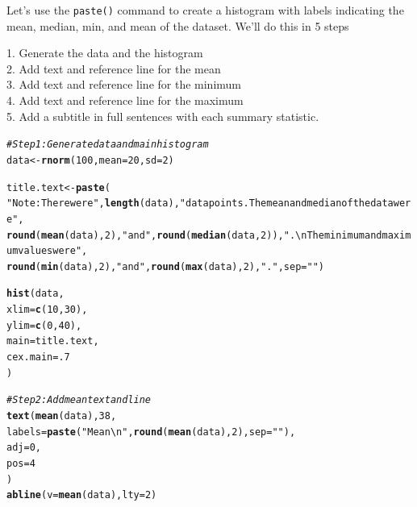 \documentclass{tufte-book}\usepackage[]{graphicx}\usepackage[]{color}
\makeatletter
\newcommand{\hlnum}[1]{\textcolor[rgb]{0.686,0.059,0.569}{#1}}%
\newcommand{\hlstr}[1]{\textcolor[rgb]{0.192,0.494,0.8}{#1}}%
\newcommand{\hlcom}[1]{\textcolor[rgb]{0.678,0.584,0.686}{\textit{#1}}}%
\newcommand{\hlstd}[1]{\textcolor[rgb]{0.345,0.345,0.345}{#1}}%
\newcommand{\hlkwb}[1]{\textcolor[rgb]{0.69,0.353,0.396}{#1}}%
\newcommand{\hlkwc}[1]{\textcolor[rgb]{0.333,0.667,0.333}{#1}}%
\newcommand{\hlkwd}[1]{\textcolor[rgb]{0.737,0.353,0.396}{\textbf{#1}}}%
\newenvironment{kframe}{%
 \def\at@end@of@kframe{}%
 \ifinner\ifhmode%
  \def\at@end@of@kframe{\end{minipage}}%
  \begin{minipage}{\columnwidth}%
 \fi\fi%
 \def\FrameCommand##1{\hskip\@totalleftmargin \hskip-\fboxsep
 \colorbox{shadecolor}{##1}\hskip-\fboxsep
     \hskip-\linewidth \hskip-\@totalleftmargin \hskip\columnwidth}%
 \MakeFramed {\advance\hsize-\width
   \@totalleftmargin\z@ \linewidth\hsize
   \@setminipage}}%
 {\par\unskip\endMakeFramed%
 \at@end@of@kframe}
\newenvironment{knitrout}{}{} %
\makeatother
\begin{document}
Let's use the \texttt{paste()} command to create a histogram with labels indicating the mean, median, min, and mean of the dataset. We'll do this in 5 steps

1. Generate the data and the histogram\\
2. Add text and reference line for the mean\\
3. Add text and reference line for the minimum\\
4. Add text and reference line for the maximum\\
5. Add a subtitle in full sentences with each summary statistic.

\begin{footnotesize}
\begin{knitrout}
\color{fgcolor}\begin{kframe}
\begin{alltt}
\hlcom{# Step 1: Generate data and main histogram}
\hlstd{data} \hlkwb{<-} \hlkwd{rnorm}\hlstd{(}\hlnum{100}\hlstd{,} \hlkwc{mean} \hlstd{=} \hlnum{20}\hlstd{,} \hlkwc{sd} \hlstd{=} \hlnum{2}\hlstd{)}

\hlstd{title.text} \hlkwb{<-} \hlkwd{paste}\hlstd{(}
  \hlstr{"Note: There were "}\hlstd{,} \hlkwd{length}\hlstd{(data),} \hlstr{" data points. The mean and median of the data were "}\hlstd{,}
  \hlkwd{round}\hlstd{(}\hlkwd{mean}\hlstd{(data),} \hlnum{2}\hlstd{),} \hlstr{" and "}\hlstd{,} \hlkwd{round}\hlstd{(}\hlkwd{median}\hlstd{(data,} \hlnum{2}\hlstd{)),} \hlstr{".\textbackslash{}nThe minimum and maximum values were "}\hlstd{,}
  \hlkwd{round}\hlstd{(}\hlkwd{min}\hlstd{(data),} \hlnum{2}\hlstd{),} \hlstr{" and "}\hlstd{,} \hlkwd{round}\hlstd{(}\hlkwd{max}\hlstd{(data),} \hlnum{2}\hlstd{),} \hlstr{"."}\hlstd{,} \hlkwc{sep} \hlstd{=} \hlstr{""}\hlstd{)}


\hlkwd{hist}\hlstd{(data,}
     \hlkwc{xlim} \hlstd{=} \hlkwd{c}\hlstd{(}\hlnum{10}\hlstd{,} \hlnum{30}\hlstd{),}
     \hlkwc{ylim} \hlstd{=} \hlkwd{c}\hlstd{(}\hlnum{0}\hlstd{,} \hlnum{40}\hlstd{),}
     \hlkwc{main} \hlstd{= title.text,}
     \hlkwc{cex.main} \hlstd{=} \hlnum{.7}
     \hlstd{)}

\hlcom{# Step 2: Add mean text and line}
\hlkwd{text}\hlstd{(}\hlkwd{mean}\hlstd{(data),} \hlnum{38}\hlstd{,}
     \hlkwc{labels} \hlstd{=} \hlkwd{paste}\hlstd{(}\hlstr{"Mean\textbackslash{}n"}\hlstd{,} \hlkwd{round}\hlstd{(}\hlkwd{mean}\hlstd{(data),} \hlnum{2}\hlstd{),} \hlkwc{sep} \hlstd{=} \hlstr{""}\hlstd{),}
     \hlkwc{adj} \hlstd{=} \hlnum{0}\hlstd{,}
     \hlkwc{pos} \hlstd{=} \hlnum{4}
\hlstd{)}
\hlkwd{abline}\hlstd{(}\hlkwc{v} \hlstd{=} \hlkwd{mean}\hlstd{(data),} \hlkwc{lty} \hlstd{=} \hlnum{2}\hlstd{)}


\end{alltt}
\end{kframe}
\end{knitrout}
\end{footnotesize}
\end{document}
